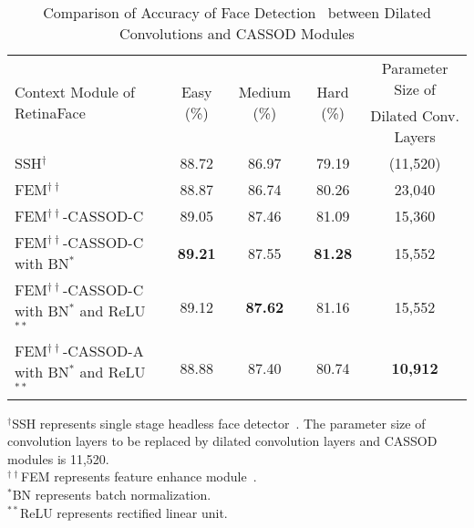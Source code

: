 \documentclass[10pt,twocolumn,letterpaper]{article}
\begin{document}
\begin{table*}
\caption{Comparison of Accuracy of Face Detection~\cite{Deng19} between Dilated Convolutions and CASSOD Modules}
\begin{center}
\begin{tabular}{l|ccc|c}
\hline
  \multirow{2}{*}{Context Module of RetinaFace~\cite{Deng19}}    & \multirow{2}{*}{Easy (\%)}   & \multirow{2}{*}{Medium (\%)}    & \multirow{2}{*}{Hard (\%)}          & Parameter Size of     \\
                                                                 &                              &                                 &                                     & Dilated Conv. Layers  \\
\hline
  SSH$^{\dag}$                                                   & 88.72                        & 86.97                           & 79.19                                & (11,520)          \\
\hline
  FEM$^{\dag \dag}$                                              & 88.87                        & 86.74                           & 80.26                                &  23,040               \\
  FEM$^{\dag \dag}$-CASSOD-C                                     & 89.05                        & 87.46                           & 81.09                                &  15,360               \\
  FEM$^{\dag \dag}$-CASSOD-C with BN$^{*}$                       & \textbf{89.21}               & 87.55                           & \textbf{81.28}                       &  15,552               \\
  FEM$^{\dag \dag}$-CASSOD-C with BN$^{*}$ and ReLU$^{**}$       & 89.12                        & \textbf{87.62}                  & 81.16                                &  15,552               \\                
  FEM$^{\dag \dag}$-CASSOD-A with BN$^{*}$ and ReLU$^{**}$       & 88.88                        & 87.40                           & 80.74                                &  \textbf{10,912}      \\                
\hline
\end{tabular}
\end{center}
{\footnotesize
$^{\dag}$SSH represents single stage headless face detector~\cite{Najibi17}. The parameter size of convolution layers to be replaced by dilated convolution layers and CASSOD modules is 11,520.\\
$^{\dag \dag}$FEM represents feature enhance module~\cite{Li18_1}.\\
$^{*}$BN represents batch normalization.\\
$^{**}$ReLU represents rectified linear unit.\\
}
\label{tab:dsfd}
\end{table*}
\end{document}
